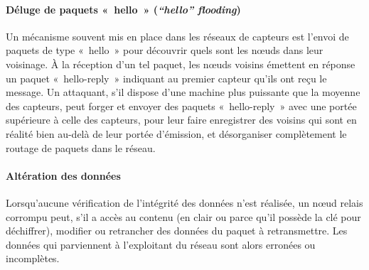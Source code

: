         \paragraph{Déluge de paquets « hello » (\textit{“hello” flooding})}
Un mécanisme souvent mis en place dans les réseaux de capteurs est l'envoi de paquets de type « hello » pour découvrir quels sont les nœuds dans leur voisinage.
À la réception d'un tel paquet, les nœuds voisins émettent en réponse un paquet « hello-reply » indiquant au premier capteur qu'ils ont reçu le message.
Un attaquant, s'il dispose d'une machine plus puissante que la moyenne des capteurs, peut forger et envoyer des paquets « hello-reply » avec une portée supérieure à celle des capteurs, pour leur faire enregistrer des voisins qui sont en réalité bien au-delà de leur portée d'émission, et désorganiser complètement le routage de paquets dans le réseau.

        \paragraph{Altération des données}
Lorsqu'aucune vérification de l'intégrité des données n'est réalisée, un nœud relais corrompu peut, s'il a accès au contenu (en clair ou parce qu'il possède la clé pour déchiffrer), modifier ou retrancher des données du paquet à retransmettre.
Les données qui parviennent à l'exploitant du réseau sont alors erronées ou incomplètes.

